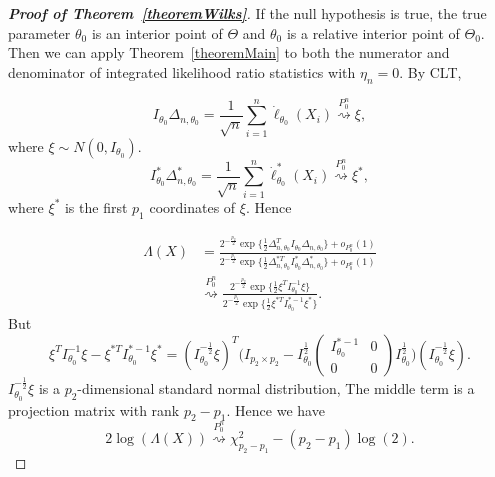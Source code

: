 \documentclass[3p]{elsarticle}
\theoremstyle{plain}
\theoremstyle{definition}
\theoremstyle{remark}
\begin{document}
\begin{proof}[\textbf{Proof of Theorem~\ref{theoremWilks}}]
    If the null hypothesis is true, the true parameter $\theta_0$ is an interior point of $\Theta$ and $\theta_0$ is a relative interior point of $\Theta_0$. Then we can apply Theorem~\ref{theoremMain} to both the numerator and denominator of integrated likelihood ratio statistics with $\eta_n=0$. By CLT,

    \begin{equation}
    I_{\theta_0}\Delta_{n,\theta_0}=\frac{1}{\sqrt{n}}\sum^n_{i=1}\dot{\ell}_{\theta_0}(X_i)\overset{P_0^n}{\rightsquigarrow }\xi, 
\end{equation}
where $\xi\sim N(0,I_{\theta_0})$.
\begin{equation}
    I^*_{\theta_0}\Delta^*_{n,\theta_0}=\frac{1}{\sqrt{n}}\sum^n_{i=1}\dot{\ell}^*_{\theta_0}(X_i)\overset{P_0^n}{\rightsquigarrow} \xi^*, 
\end{equation}
where $\xi^*$ is the first $p_1$ coordinates of $\xi$. Hence


\begin{equation}\label{equationNull}
    \begin{aligned} 
        \Lambda(X)&=
        \frac{2^{-\frac{p_2}{2}}\exp\{\frac{1}{2}\Delta_{n,\theta_0}^T I_{\theta_0}\Delta_{n,\theta_0}\}+o_{P_0^n}(1)
        }{2^{-\frac{p_1}{2}}\exp\{\frac{1}{2}\Delta_{n,\theta_0}^{*T}I^*_{\theta_0}\Delta^*_{n,\theta_0}\}+o_{P_0^n}(1)
        }
        \\
        &\overset{P_{0}^n}{\rightsquigarrow }
        \frac{2^{-\frac{p_2}{2}}\exp\{\frac{1}{2}\xi^T I^{-1}_{\theta_0}\xi\}
        }{2^{-\frac{p_1}{2}}\exp\{\frac{1}{2}\xi^{*T}I^{*-1}_{\theta_0}\xi^*\}
        }.
    \end{aligned}
\end{equation}
But
\begin{equation}\label{equationXi}
    \xi^T I^{-1}_{\theta_0}\xi -\xi^{*T}I^{*-1}_{\theta_0}\xi^*
    ={(I_{\theta_0}^{-\frac{1}{2}}\xi)}^T\Big(
        I_{p_{2}\times p_{2}}-
        I_{\theta_0}^{\frac{1}{2}}
        \left(\begin{matrix} 
                I^{*-1}_{\theta_0}&0\\
                0&0
        \end{matrix}\right)
        I_{\theta_0}^{\frac{1}{2}}
    \Big)(I_{\theta_0}^{-\frac{1}{2}}\xi).
\end{equation}
    $I_{\theta_0}^{-\frac{1}{2}}\xi$ is a $p_2$-dimensional standard normal distribution, The middle term is a projection matrix with rank $p_2-p_1$. Hence we have
\begin{equation}
    2\log(\Lambda(X))\overset{P_0^n}{\rightsquigarrow} \chi^2_{p_2-p_1}-(p_2-p_1)\log(2).
\end{equation}
\end{proof}
\end{document}
